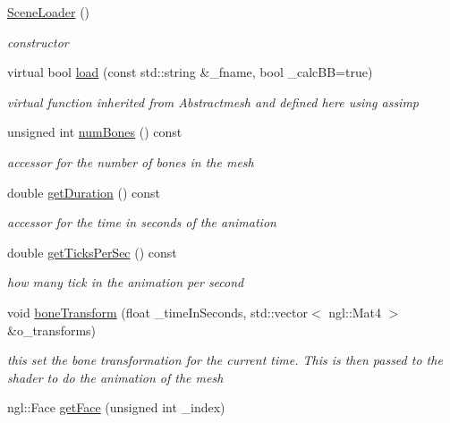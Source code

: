 \begin{DoxyCompactItemize}
\item 
\hyperlink{class_scene_loader_a3b259dbd31c787f0cd7a6b63bd3cd200}{Scene\-Loader} ()
\begin{DoxyCompactList}\small\item\em constructor \end{DoxyCompactList}\item 
virtual bool \hyperlink{class_scene_loader_ad00aff2b9f8c3e7953b6e5dd7444fb9a}{load} (const std\-::string \&\-\_\-fname, bool \-\_\-calc\-B\-B=true)
\begin{DoxyCompactList}\small\item\em virtual function inherited from Abstractmesh and defined here using assimp \end{DoxyCompactList}\item 
unsigned int \hyperlink{class_scene_loader_a0a13951dbe8ccf74b78de0d211fccf54}{num\-Bones} () const 
\begin{DoxyCompactList}\small\item\em accessor for the number of bones in the mesh \end{DoxyCompactList}\item 
double \hyperlink{class_scene_loader_ab0c71c24ce931bcc72f7f0da0b446749}{get\-Duration} () const 
\begin{DoxyCompactList}\small\item\em accessor for the time in seconds of the animation \end{DoxyCompactList}\item 
double \hyperlink{class_scene_loader_aed77ebdcac27b60d38d55dba797be45e}{get\-Ticks\-Per\-Sec} () const 
\begin{DoxyCompactList}\small\item\em how many tick in the animation per second \end{DoxyCompactList}\item 
void \hyperlink{class_scene_loader_a4405e9ee3d3e20bf199f84dcd67e7c3d}{bone\-Transform} (float \-\_\-time\-In\-Seconds, std\-::vector$<$ ngl\-::\-Mat4 $>$ \&o\-\_\-transforms)
\begin{DoxyCompactList}\small\item\em this set the bone transformation for the current time. This is then passed to the shader to do the animation of the mesh \end{DoxyCompactList}\item 
ngl\-::\-Face \hyperlink{class_scene_loader_a3369b4f8e5bf4a90b59c51ce9817a867}{get\-Face} (unsigned int \-\_\-index)
\end{DoxyCompactItemize}
